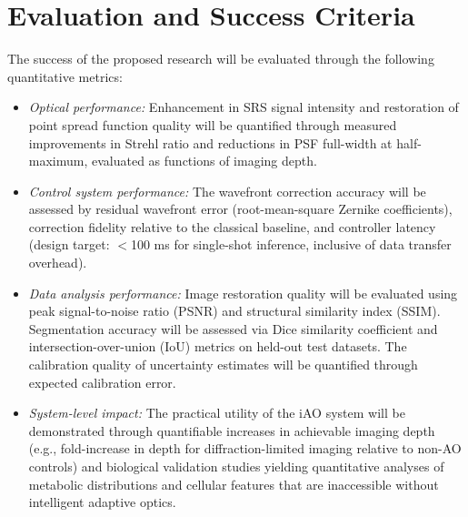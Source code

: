 \documentclass[12pt,a4paper]{article}
\begin{document}
\section{Evaluation and Success Criteria}
The success of the proposed research will be evaluated through the following quantitative metrics:
\begin{itemize}
  \item \textit{Optical performance:} Enhancement in SRS signal intensity and restoration of point spread function quality will be quantified through measured improvements in Strehl ratio and reductions in PSF full-width at half-maximum, evaluated as functions of imaging depth.
  \item \textit{Control system performance:} The wavefront correction accuracy will be assessed by residual wavefront error (root-mean-square Zernike coefficients), correction fidelity relative to the classical baseline, and controller latency (design target: $<$100 ms for single-shot inference, inclusive of data transfer overhead).
  \item \textit{Data analysis performance:} Image restoration quality will be evaluated using peak signal-to-noise ratio (PSNR) and structural similarity index (SSIM). Segmentation accuracy will be assessed via Dice similarity coefficient and intersection-over-union (IoU) metrics on held-out test datasets. The calibration quality of uncertainty estimates will be quantified through expected calibration error.
  \item \textit{System-level impact:} The practical utility of the iAO system will be demonstrated through quantifiable increases in achievable imaging depth (e.g., fold-increase in depth for diffraction-limited imaging relative to non-AO controls) and biological validation studies yielding quantitative analyses of metabolic distributions and cellular features that are inaccessible without intelligent adaptive optics.
\end{itemize}

\end{document}
